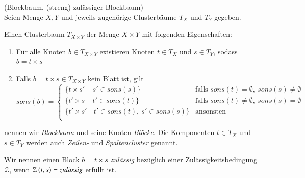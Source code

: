       \begin{defn}
	(Blockbaum, (streng) zulässiger Blockbaum)\\
	Seien Menge $X, Y$ und jeweils zugehörige Clusterbäume $T_X$ und $T_Y$ gegeben.
	
	Einen Clusterbaum $T_{X \times Y}$ der Menge $X \times Y$ mit folgenden Eigenschaften:
	\begin{enumerate}
	  \item Für alle Knoten $b \in T_{X \times Y}$ existieren Knoten $t \in T_X$ und $s \in T_Y$, sodass $b = t \times s$
	  \item Falls $b = t \times s \in T_{X \times Y}$ kein Blatt ist, gilt
	  \begin{equation*}
	    sons\left(b\right) = 
	    \begin{cases}
	      \{ t \times s'\ \,\ | \  s'\!\in sons\left(s\right) \} & \text{falls } sons\left(t\right) = \emptyset, \ sons\left(s\right) \neq \emptyset \\
	      \{ t' \times s\ \,\ | \  t'  \in sons\left(t\right) \} & \text{falls } sons\left(t\right) \neq \emptyset, \ sons\left(s\right) = \emptyset \\
	      \{ t' \times s' \:\ | \  t'  \in sons\left(t\right),\ s' \in sons\left(s\right) \} & \text{ansonsten}\\
	    \end{cases}
	  \end{equation*}
	\end{enumerate}
	nennen wir \textit{Blockbaum} und seine Knoten \textit{Blöcke}. Die Komponenten $t \in T_X$ und $s \in T_Y$ werden auch \textit{Zeilen-} und \textit{Spaltencluster}
	genannt.
	
	Wir nennen einen Block $b = t \times s$ \textit{zulässig} bezüglich einer Zulässigkeitsbedingung $\mathcal{Z}$, wenn $\mathcal{Z}\left(t,s\right) = \text{\textit{zulässig}}$ erfüllt ist.
	

\end{defn}
